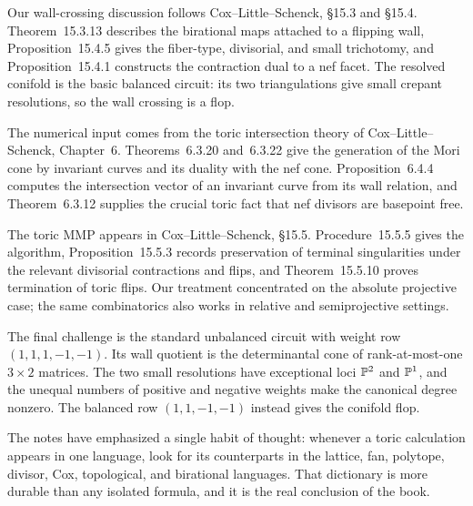 Our wall-crossing discussion follows Cox--Little--Schenck, \S15.3 and
\S15.4.  Theorem~15.3.13 describes the birational maps attached to a
flipping wall, Proposition~15.4.5 gives the fiber-type, divisorial, and
small trichotomy, and Proposition~15.4.1 constructs the contraction
dual to a nef facet.  The resolved conifold is the basic balanced
circuit: its two triangulations give small crepant resolutions, so the
wall crossing is a flop.

The numerical input comes from the toric intersection theory of
Cox--Little--Schenck, Chapter~6.  Theorems~6.3.20 and~6.3.22 give the
generation of the Mori cone by invariant curves and its duality with
the nef cone.  Proposition~6.4.4 computes the intersection vector of
an invariant curve from its wall relation, and Theorem~6.3.12 supplies
the crucial toric fact that nef divisors are basepoint free.

The toric MMP appears in Cox--Little--Schenck, \S15.5.
Procedure~15.5.5 gives the algorithm, Proposition~15.5.3 records
preservation of terminal singularities under the relevant divisorial
contractions and flips, and Theorem~15.5.10 proves termination of
toric flips.  Our treatment concentrated on the absolute projective
case; the same combinatorics also works in relative and
semiprojective settings.

The final challenge is the standard unbalanced circuit with weight row
\((1,1,1,-1,-1)\).  Its wall quotient is the determinantal cone of
rank-at-most-one \(3\times2\) matrices.  The two small resolutions have
exceptional loci \(\mathbb{P}^2\) and \(\mathbb{P}^1\), and the unequal numbers of
positive and negative weights make the canonical degree nonzero.  The
balanced row \((1,1,-1,-1)\) instead gives the conifold flop.

The notes have emphasized a single habit of thought: whenever a toric
calculation appears in one language, look for its counterparts in the
lattice, fan, polytope, divisor, Cox, topological, and birational
languages.  That dictionary is more durable than any isolated formula,
and it is the real conclusion of the book.
